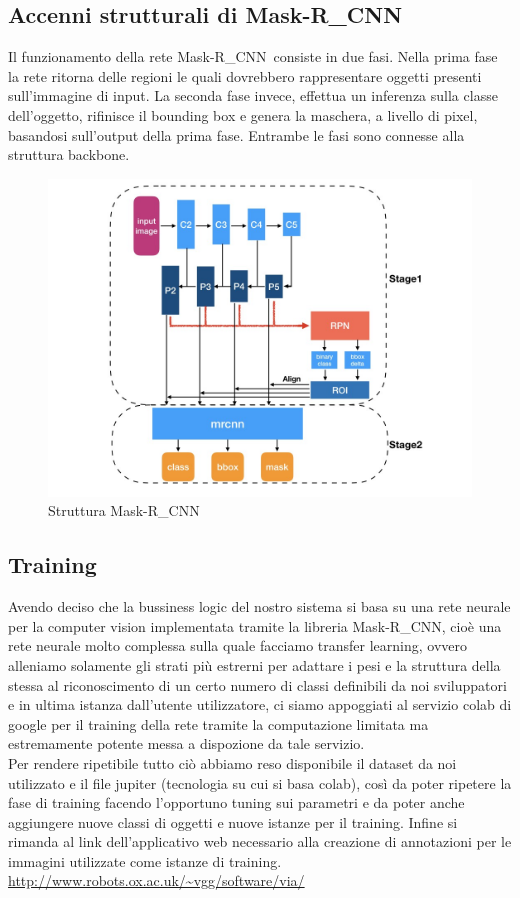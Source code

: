\documentclass[12pt,a4paper]{article}
\newcommand{\mrcnn}{Mask-R\_CNN}
\begin{document}
\subsection{Accenni strutturali di \mrcnn}

Il funzionamento della rete \mrcnn\ consiste in due fasi. Nella prima
fase la rete ritorna delle regioni le quali dovrebbero rappresentare
oggetti presenti sull'immagine di input. La seconda fase invece,
effettua un inferenza sulla classe dell'oggetto, rifinisce il bounding
box e genera la maschera, a livello di pixel, basandosi sull'output
della prima fase. Entrambe le fasi sono connesse alla struttura
backbone.

\begin{figure}[H]
    \caption{Struttura \mrcnn}
    \centering
    \includegraphics[width=\textwidth,height=\textheight,keepaspectratio]{mask_description.jpg}
\end{figure}

\subsection{Training}

Avendo deciso che la bussiness logic del nostro sistema si basa su una rete
neurale per la computer vision implementata tramite la libreria \mrcnn, cioè una
rete neurale molto complessa sulla quale facciamo transfer learning, ovvero
alleniamo solamente gli strati più estrerni per adattare i pesi e la struttura
della stessa al riconoscimento di un certo numero di classi definibili da noi
sviluppatori e in ultima istanza dall'utente utilizzatore, ci siamo appoggiati
al servizio colab di google per il training della rete tramite la computazione
limitata ma estremamente potente messa a dispozione da tale servizio.\\ Per
rendere ripetibile tutto ciò abbiamo reso disponibile il dataset da noi
utilizzato e il file jupiter (tecnologia su cui si basa colab), così da poter
ripetere la fase di training facendo l'opportuno tuning sui parametri e da
poter anche aggiungere nuove classi di oggetti e nuove istanze per il training.
Infine si rimanda al link dell'applicativo web necessario alla creazione di
annotazioni per le immagini utilizzate come istanze di training.
\url{http://www.robots.ox.ac.uk/~vgg/software/via/}
\end{document}
